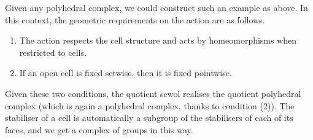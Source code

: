 Given any polyhedral complex, we could construct such an example as above.
In this context, the geometric requirements on the action are as follows.
\begin{enumerate}
	\item The action respects the cell structure and acts by homeomorphisms when restricted to cells.
	\item If an open cell is fixed setwise, then it is fixed pointwise.
\end{enumerate}
Given these two conditions, the quotient scwol realises the quotient polyhedral complex (which is again a polyhedral complex, thanks to condition (2)).
The stabiliser of a cell is automatically a subgroup of the stabilisers of each of its faces, and we get a complex of groups in this way.


